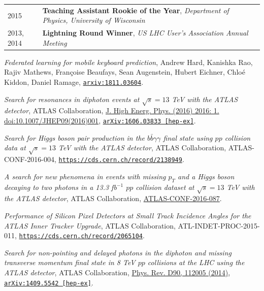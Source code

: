 \documentclass{letter}
\begin{document}
\begin{tabular}{p{}p{}}
  2015
  &
  \textbf{Teaching Assistant Rookie of the Year}, \textit{Department of Physics, University of Wisconsin} 
  \\
  2013, 2014
  & 
  \textbf{Lightning Round Winner}, \textit{US LHC User's Association Annual Meeting}
  \\
\end{tabular}



\begin{flushleft}
  \Large{\textsc{\textbf{\color{Maroon}{Selected Publications}}}}
  \vspace{1pt}  %
\end{flushleft}

\textit{Federated learning for mobile keyboard prediction}, Andrew Hard, Kanishka Rao, Rajiv Mathews, Fran{\c c}oise Beaufays, Sean Augenstein, Hubert Eichner, Chlo{\'e} Kiddon, Daniel Ramage, \href{https://arxiv.org/abs/1811.03604}{\texttt{arxiv:1811.03604}}.

\textit{Search for resonances in diphoton events at $\sqrt{s}=13$ TeV with the ATLAS detector}, ATLAS Collaboration, \href{http://link.springer.com/article/10.1007/JHEP09(2016)001}{J. High Energ. Phys. (2016) 2016: 1. doi:10.1007/JHEP09(2016)001}, \href{http://arxiv.org/abs/1606.03833}{\texttt{arXiv:1606.03833 [hep-ex]}}.

\textit{Search for Higgs boson pair production in the $b \bar{b} \gamma \gamma$ final state using $pp$ collision data at $\sqrt{s}=13$ TeV with the ATLAS detector}, ATLAS Collaboration, ATLAS-CONF-2016-004, \href{https://cds.cern.ch/record/2138949}{\texttt{https://cds.cern.ch/record/2138949}}.

\textit{A search for new phenomena in events with missing $p_{T}$ and a Higgs boson decaying to two photons in a 13.3 fb$^{-1}$ $pp$ collision dataset at $\sqrt{s}=13$ TeV with the ATLAS detector}, ATLAS Collaboration, \href{https://cds.cern.ch/record/2206281}{ATLAS-CONF-2016-087}.

\textit{Performance of Silicon Pixel Detectors at Small Track Incidence Angles for the ATLAS Inner Tracker Upgrade}, ATLAS Collaboration, ATL-INDET-PROC-2015-011, \href{https://cds.cern.ch/record/2065104}{\texttt{https://cds.cern.ch/record/2065104}}.

\textit{Search for non-pointing and delayed photons in the diphoton and missing transverse momentum final state in 8 TeV $pp$ collisions at the LHC using the ATLAS detector}, ATLAS Collaboration, 
\href{http://journals.aps.org/prd/abstract/10.1103/PhysRevD.90.112005}{Phys. Rev. D90, 112005 (2014)}, \href{https://arxiv.org/abs/1409.5542}{\texttt{arXiv:1409.5542 [hep-ex]}}.
\end{document}
